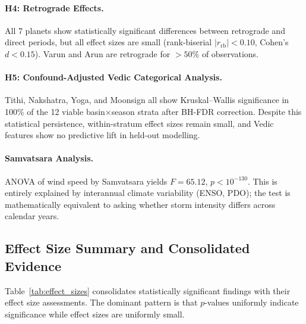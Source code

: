 \documentclass[12pt,a4paper]{article}
\begin{document}
    \paragraph{H4: Retrograde Effects.}
    All 7 planets show statistically significant differences between retrograde
    and direct periods, but all effect sizes are small (rank-biserial
    $|r_{\text{rb}}| < 0.10$, Cohen's $d < 0.15$). Varun and Arun are retrograde
    for $> 50\%$ of observations.

    \paragraph{H5: Confound-Adjusted Vedic Categorical Analysis.}
    Tithi, Nakshatra, Yoga, and Moonsign all show Kruskal--Wallis significance in
    100\% of the 12 viable basin$\times$season strata after BH-FDR correction.
    Despite this statistical persistence, within-stratum effect sizes remain small,
    and Vedic features show no predictive lift in held-out modelling.

    \paragraph{Samvatsara Analysis.}
    ANOVA of wind speed by Samvatsara yields $F = 65.12$, $p < 10^{-130}$.
    This is entirely explained by interannual climate variability (ENSO, PDO);
    the test is mathematically equivalent to asking whether storm intensity differs
    across calendar years.

    \subsection{Effect Size Summary and Consolidated Evidence}

    Table~\ref{tab:effect_sizes} consolidates statistically significant findings
    with their effect size assessments. The dominant pattern is that $p$-values
    uniformly indicate significance while effect sizes are uniformly small.
\end{document}
